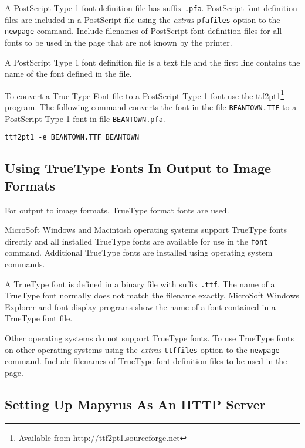A PostScript Type 1 font definition file has suffix \texttt{.pfa}.  PostScript
font definition files are included in a PostScript file using the
\textit{extras} \texttt{pfafiles} option to the \texttt{newpage} command.
Include filenames of PostScript font definition files for all fonts to be used
in the page that are not known by the printer.

A PostScript Type 1 font definition file is a text file and
the first line contains the name of the font defined in the file.

To convert a True Type Font file to a PostScript Type 1 font use the
ttf2pt1\footnote{Available from http://ttf2pt1.sourceforge.net} program.  The
following command converts the font in the file \texttt{BEANTOWN.TTF} to a
PostScript Type 1 font in file \texttt{BEANTOWN.pfa}.

\begin{verbatim}
ttf2pt1 -e BEANTOWN.TTF BEANTOWN
\end{verbatim}

\subsection{Using TrueType Fonts In Output to Image Formats}
\label{ttffonts}

For output to image formats, TrueType format fonts are used.

MicroSoft Windows and Macintosh operating systems support TrueType
fonts directly and all installed TrueType fonts are available
for use in the \texttt{font} command.
Additional TrueType fonts are installed using operating system commands.

A TrueType font is defined in a binary file with suffix
\texttt{.ttf}.
The name of a TrueType font normally does not match the filename exactly.
MicroSoft Windows Explorer and font display programs show the name of
a font contained in a TrueType font file.

Other operating systems do not support TrueType fonts.  To use TrueType fonts
on other operating systems using the \textit{extras} \texttt{ttffiles} option
to the \texttt{newpage} command.  Include filenames of TrueType font definition
files to be used in the page.

\subsection{Setting Up Mapyrus As An HTTP Server}
\label{tutorialhttpserver}

